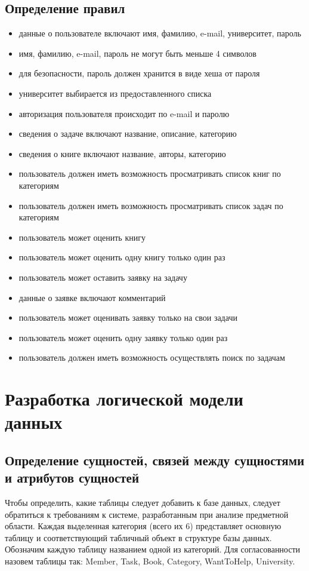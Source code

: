 \subsection{Определение правил }
\begin{itemize}
\item данные о пользователе включают имя, фамилию, e-mail, университет, пароль
\item имя, фамилию, e-mail, пароль не могут быть меньше 4 символов
\item для безопасности, пароль должен хранится в виде хеша от пароля
\item университет выбирается из предоставленного списка
\item авторизация пользователя происходит по e-mail и паролю
\item сведения о задаче включают название, описание, категорию
\item сведения о книге включают название, авторы, категорию
\item пользователь должен иметь возможность просматривать список книг по категориям
\item пользователь должен иметь возможность просматривать список задач по категориям
\item пользователь может оценить книгу
\item пользователь может оценить одну книгу только один раз
\item пользователь может оставить заявку на задачу
\item данные о заявке включают комментарий
\item пользователь может оценивать заявку только на свои задачи
\item пользователь может оценить одну заявку только один раз
\item пользователь должен иметь возможность осуществлять поиск по задачам
\end{itemize}

\section{Разработка логической модели данных}

\subsection{Определение сущностей, связей между сущностями и атрибутов сущностей}

Чтобы определить, какие таблицы следует добавить к базе данных, следует обратиться к требованиям к системе, разработанным при анализе предметной области. Каждая выделенная категория (всего их 6) представляет основную таблицу и соответствующий табличный объект в структуре базы данных. Обозначим каждую таблицу названием одной из категорий. Для согласованности назовем таблицы так: Member, Task, Book, Category, WantToHelp, University. 

